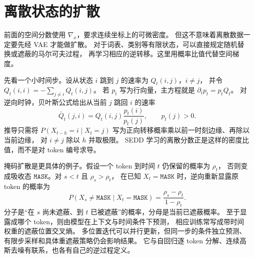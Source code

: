 \section{离散状态的扩散}
前面的空间分数使用 $\nabla_x$，要求连续坐标上的可微密度。
但这不意味着离散数据一定要先经 VAE 才能做扩散。
对于词表、类别等有限状态，可以直接规定随机替换或遮蔽的马尔可夫过程，
再学习相应的逆转移。这里用概率比值代替空间梯度。

先看一个小时间步。设从状态 $i$ 跳到 $j$ 的速率为 $Q_t(i,j)$，$i\ne j$，
并令 $Q_t(i,i)=-\sum_{j\ne i}Q_t(i,j)$。
若 $p_t$ 写为行向量，主方程就是 $\partial_tp_t=p_tQ_t$。
对逆向时钟，贝叶斯公式给出从当前 $j$ 跳回 $i$ 的速率
\[
\bar Q_t(j,i)=Q_t(i,j)\frac{p_t(i)}{p_t(j)},\qquad p_t(j)>0.
\]
推导只需将
$P(X_{t-h}=i\mid X_t=j)$ 写为正向转移概率乘以前一时刻边缘、再除以当前边缘，
对 $i\ne j$ 除以 $h$ 并取极限。
SEDD 学习的离散分数正是这样的密度比值，而不是对 token 编号求导。\cite{sedd}

掩码扩散是更具体的例子。假设一个 token 到时间 $t$ 仍保留的概率为 $\rho_t$，
否则变成吸收态 $\mathtt{MASK}$。对 $s<t$ 且 $\rho_s>\rho_t$，
在已知 $X_t=\mathtt{MASK}$ 时，逆向重新显露原 token 的概率为
\[
P(X_s\ne\mathtt{MASK}\mid X_t=\mathtt{MASK})
=\frac{\rho_s-\rho_t}{1-\rho_t}.
\]
分子是“在 $s$ 尚未遮蔽、到 $t$ 已被遮蔽”的概率，分母是当前已遮蔽概率。
至于显露成哪个 token，则由模型在上下文与时间条件下预测，
相应训练常写成带时间权重的遮蔽位置交叉熵。
多位置迭代可以并行更新，但同一步的条件独立预测、有限步采样和具体重遮蔽策略仍会影响结果。
它与自回归逐 token 分解、连续高斯去噪有联系，也各有自己的逆过程定义。\cite{mdlm,theorybook}
